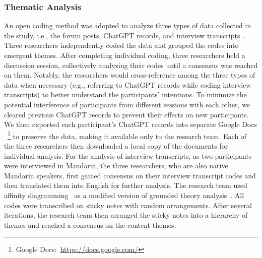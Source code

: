 \subsubsection{Thematic Analysis}
An open coding method was adopted to analyze three types of data collected in the study, i.e., the forum posts, ChatGPT records, and interview transcripts~\cite{corbin_basics_2008}. Three researchers independently coded the data and grouped the codes into emergent themes. After completing individual coding, three researchers held a discussion session, collectively analyzing their codes until a consensus was reached on them. Notably, the researchers would cross-reference among the three types of data when necessary (e.g., referring to ChatGPT records while coding interview transcripts) to better understand the participants' intentions. To minimize the potential interference of participants from different sessions with each other, we cleared previous ChatGPT records to prevent their effects on new participants. We then exported each participant's ChatGPT records into separate Google Docs ~\footnote{Google Docs:~\url{https://docs.google.com/}} to preserve the data, making it available only to the research team. Each of the three researchers then downloaded a local copy of the documents for individual analysis. For the analysis of interview transcripts, as two participants were interviewed in Mandarin, the three researchers, who are also native Mandarin speakers, first gained consensus on their interview transcript codes and then translated them into English for further analysis. The research team used affinity diagramming~\cite{beyer_contextual_1997} as a modified version of grounded theory analysis~\cite{corbin_basics_2008}. All codes were transcribed on sticky notes with random arrangements. After several iterations, the research team then arranged the sticky notes into a hierarchy of themes and reached a consensus on the content themes.